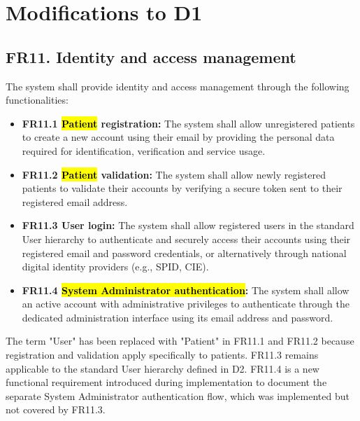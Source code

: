 \section{Modifications to D1}

\subsection{FR11. Identity and access management} \label{FR11}
The system shall provide identity and access management through the following functionalities:
\begin{itemize}
    \item \textbf{FR11.1 \hl{Patient} registration:} The system shall allow unregistered patients to create a new account using their email by providing the personal data required for identification, verification and service usage.

    \item \textbf{FR11.2 \hl{Patient} validation:} The system shall allow newly registered patients to validate their accounts by verifying a secure token sent to their registered email address.

    \item \textbf{FR11.3 User login:} The system shall allow registered users in the standard User hierarchy to authenticate and securely access their accounts using their registered email and password credentials, or alternatively through national digital identity providers (e.g., SPID, CIE).

    \item \textbf{FR11.4 \hl{System Administrator authentication}:} The system shall allow an active account with administrative privileges to authenticate through the dedicated administration interface using its email address and password. 
\end{itemize}
\vspace{0.3cm}

The term "User" has been replaced with "Patient" in FR11.1 and FR11.2 because registration and validation apply specifically to patients. FR11.3 remains applicable to the standard User hierarchy defined in D2. FR11.4 is a new functional requirement introduced during implementation to document the separate System Administrator authentication flow, which was implemented but not covered by FR11.3.

